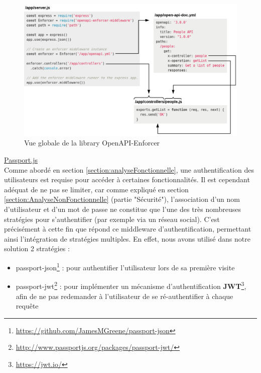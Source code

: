 \begin{figure}[H]
    \includegraphics[width=\textwidth,height=\textheight,keepaspectratio]{images/libraries/openapi-enforcer.png}
    \centering
    \caption[Vue globale de la \gls{library} OpenAPI-Enforcer]{Vue globale de la \gls{library} OpenAPI-Enforcer 
        \footnotemark
    }
    \label{fig:OASEnforcer}
\end{figure}

\noindent\underline{\href{http://www.passportjs.org/}{Passport.js}}\\

Comme abordé en section \ref{section:analyseFonctionnelle}, une authentification des utilisateurs est requise pour accéder à certaines fonctionnalités.
Il est cependant adéquat de ne pas se limiter, car comme expliqué en section \ref{section:AnalyseNonFonctionnelle} (partie "Sécurité"), l'association d'un nom d'utilisateur et d'un mot de passe ne constitue que l'une des très nombreuses stratégies pour s'authentifier (par exemple via un réseau social).
C'est précisément à cette fin que répond ce \gls{middleware} d'authentification, permettant ainsi l'intégration de stratégies multiples.
En effet, nous avons utilisé dans notre solution 2 stratégies :

\begin{itemize}[nosep,noitemsep,topsep=0pt,partopsep=0pt,after=\vspace*{2pt}]
    \item passport-json\footnote{
        \url{https://github.com/JamesMGreene/passport-json}
    } : pour authentifier l'utilisateur lors de sa première visite
    \item passport-jwt\footnote{
        \url{http://www.passportjs.org/packages/passport-jwt/}
        } : pour implémenter un mécanisme d'authentification \textbf{JWT}\footnote{
            \url{https://jwt.io/}
        }, afin de ne pas redemander à l'utilisateur de se ré-authentifier à chaque requête
\end{itemize}

